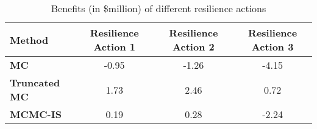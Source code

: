 \begin{table}[h]
    \centering
    \caption{Benefits (in \$million) of different resilience actions}
    \begin{tabular}{lccc}
        \hline
        \textbf{Method} & \textbf{Resilience Action 1} & \textbf{Resilience Action 2} & \textbf{Resilience Action 3} \\ \hline
        \textbf{MC} & -0.95 & -1.26 & -4.15 \\ 
        \textbf{Truncated MC} & 1.73 & 2.46 & 0.72 \\ 
        \textbf{MCMC-IS} & 0.19 & 0.28 & -2.24 \\ \hline
    \end{tabular}
    \label{tab:cost_benefit}
\end{table}

